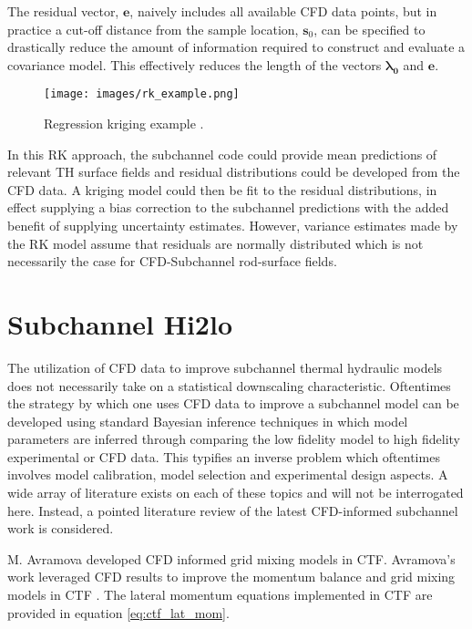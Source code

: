 The residual vector, $\mathbf e$, naively includes all available CFD data points, but in practice a cut-off distance from the sample location, $\mathbf s_0$, can be specified to drastically reduce the amount of information required to construct and evaluate a covariance model.  This effectively reduces the length of the vectors $\mathbf{\lambda_0}$ and $\mathbf e$.

\begin{figure}[hbtp]
\centering
\texttt{[image: images/rk\_example.png]}
\caption[Regression kriging example.]{Regression kriging example \cite{Hengl07}.}
\label{fit:rk}
\end{figure}

In this RK approach, the subchannel code could provide mean predictions of relevant TH surface fields and residual distributions could be developed from the CFD data.  A kriging model could then be fit to the residual distributions, in effect supplying a bias correction to the subchannel predictions with the added benefit of supplying uncertainty estimates.  However, variance estimates made by the RK model assume that residuals are normally distributed which is not necessarily the case for CFD-Subchannel rod-surface fields.


\section{Subchannel Hi2lo}

The utilization of CFD data to improve subchannel thermal hydraulic models does not necessarily take on a statistical downscaling characteristic.  Oftentimes the strategy by which one uses CFD data to improve a subchannel model can be developed using standard Bayesian inference techniques in which model parameters are inferred through comparing the low fidelity model to high fidelity experimental or CFD data.  This typifies an inverse problem which oftentimes involves  model calibration, model selection and experimental design aspects.  A wide array of literature exists on each of these topics and will not be interrogated here.  Instead, a pointed literature review of the latest CFD-informed subchannel work is considered.

 M. Avramova developed CFD informed grid mixing models in CTF.  Avramova's work leveraged CFD results to improve the momentum balance and grid mixing models in CTF \cite{avramova2007}.  The lateral momentum equations implemented in CTF are provided in equation \ref{eq:ctf_lat_mom}.

